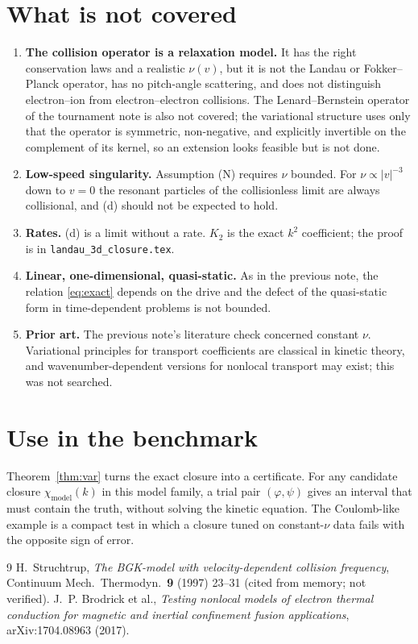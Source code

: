 \documentclass[11pt]{article}
\theoremstyle{remark}
\begin{document}
\section{What is not covered}
\label{sec:limits}

\begin{enumerate}
  \item \textbf{The collision operator is a relaxation model.} It has the
    right conservation laws and a realistic $\nu(v)$, but it is not the
    Landau or Fokker--Planck operator, has no pitch-angle scattering, and
    does not distinguish electron--ion from electron--electron collisions.
    The Lenard--Bernstein operator of the tournament note is also not
    covered; the variational structure uses only that the operator is
    symmetric, non-negative, and explicitly invertible on the complement of
    its kernel, so an extension looks feasible but is not done.
  \item \textbf{Low-speed singularity.} Assumption (N) requires $\nu$
    bounded. For $\nu\propto|v|^{-3}$ down to $v=0$ the resonant particles
    of the collisionless limit are always collisional, and (d) should not be
    expected to hold.
  \item \textbf{Rates.} (d) is a limit without a rate. $K_2$ is the exact
    $k^2$ coefficient; the proof is in \texttt{landau\_3d\_closure.tex}.
  \item \textbf{Linear, one-dimensional, quasi-static.} As in the previous
    note, the relation \eqref{eq:exact} depends on the drive and the defect
    of the quasi-static form in time-dependent problems is not bounded.
  \item \textbf{Prior art.} The previous note's literature check concerned
    constant $\nu$. Variational principles for transport coefficients are
    classical in kinetic theory, and wavenumber-dependent versions for
    nonlocal transport may exist; this was not searched.
\end{enumerate}

\section{Use in the benchmark}

Theorem~\ref{thm:var} turns the exact closure into a certificate. For any
candidate closure $\chi_{\mathrm{model}}(k)$ in this model family, a trial
pair $(\varphi,\psi)$ gives an interval that must contain the truth, without
solving the kinetic equation. The Coulomb-like example is a compact test in
which a closure tuned on constant-$\nu$ data fails with the opposite sign of
error.

\begin{thebibliography}{9}
 H.~Struchtrup, \emph{The BGK-model with
velocity-dependent collision frequency}, Continuum Mech.\ Thermodyn.\
\textbf{9} (1997) 23--31 (cited from memory; not verified).
 J.~P. Brodrick et al., \emph{Testing nonlocal models of
electron thermal conduction for magnetic and inertial confinement fusion
applications}, arXiv:1704.08963 (2017).
\end{thebibliography}
\end{document}
